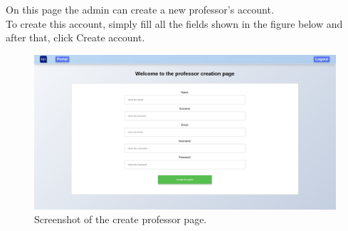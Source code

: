 On this page the admin can create a new professor's account.\\
To create this account, simply fill all the fields shown in the figure below and after that, click Create account.\\

\begin{figure}[H]
    \centering
     \includegraphics[width=1\textwidth]{img/user_manual/admin/create-professor.png}
    \caption{\label{fig:create-professor} Screenshot of the create professor page.}
\end{figure}
